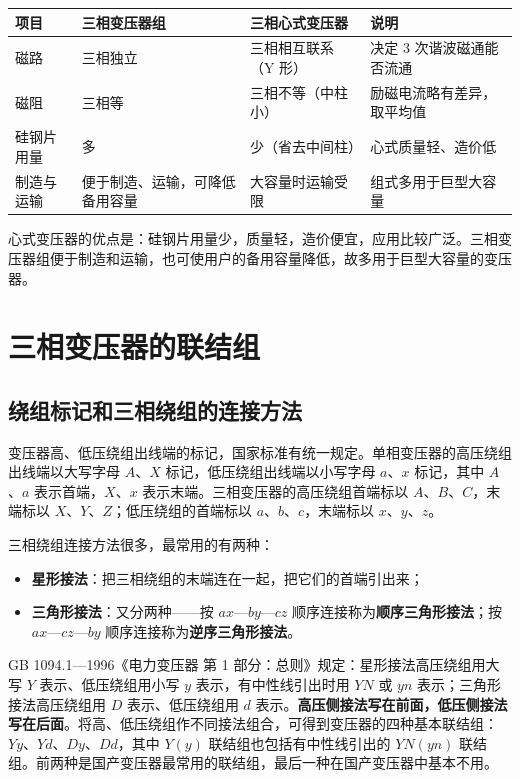 \begin{center}
\begin{tabular}{@{}p{2.3cm}p{3.5cm}p{4.0cm}p{3.6cm}@{}}
\toprule
项目 & 三相变压器组 & 三相心式变压器 & 说明 \\
\midrule
磁路 & 三相独立 & 三相相互联系（Y 形） & 决定 3 次谐波磁通能否流通 \\
磁阻 & 三相等 & 三相不等（中柱小） & 励磁电流略有差异，取平均值 \\
硅钢片用量 & 多 & 少（省去中间柱） & 心式质量轻、造价低 \\
制造与运输 & 便于制造、运输，可降低备用容量 & 大容量时运输受限 & 组式多用于巨型大容量 \\
\bottomrule
\end{tabular}
\end{center}

心式变压器的优点是：硅钢片用量少，质量轻，造价便宜，应用比较广泛。三相变压器组便于制造和运输，也可使用户的备用容量降低，故多用于巨型大容量的变压器。

\section{三相变压器的联结组}

\subsection{绕组标记和三相绕组的连接方法}
变压器高、低压绕组出线端的标记，国家标准有统一规定。单相变压器的高压绕组出线端以大写字母 $A$、$X$ 标记，低压绕组出线端以小写字母 $a$、$x$ 标记，其中 $A$、$a$ 表示首端，$X$、$x$ 表示末端。三相变压器的高压绕组首端标以 $A$、$B$、$C$，末端标以 $X$、$Y$、$Z$；低压绕组的首端标以 $a$、$b$、$c$，末端标以 $x$、$y$、$z$。

三相绕组连接方法很多，最常用的有两种：
\begin{itemize}
  \item \textbf{星形接法}：把三相绕组的末端连在一起，把它们的首端引出来；
  \item \textbf{三角形接法}：又分两种——按 $ax$—$by$—$cz$ 顺序连接称为\textbf{顺序三角形接法}；按 $ax$—$cz$—$by$ 顺序连接称为\textbf{逆序三角形接法}。
\end{itemize}

GB 1094.1—1996《电力变压器 第 1 部分：总则》规定：星形接法高压绕组用大写 $Y$ 表示、低压绕组用小写 $y$ 表示，有中性线引出时用 $YN$ 或 $yn$ 表示；三角形接法高压绕组用 $D$ 表示、低压绕组用 $d$ 表示。\textbf{高压侧接法写在前面，低压侧接法写在后面}。将高、低压绕组作不同接法组合，可得到变压器的四种基本联结组：$Yy$、$Yd$、$Dy$、$Dd$，其中 $Y(y)$ 联结组也包括有中性线引出的 $YN(yn)$ 联结组。前两种是国产变压器最常用的联结组，最后一种在国产变压器中基本不用。

